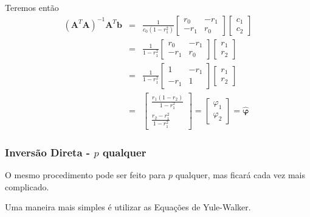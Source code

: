 \begin{frame}[allowframebreaks]
  Teremos então
  \begin{eqnarray}
  (\mathbf{A}^T \mathbf{A})^{-1} \mathbf{A}^T\mathbf{b} &=& \frac{1}{c_0 ( 1 - r_1^2)} \begin{bmatrix} r_0 & -r_1 \\ -r_1 & r_0 \end{bmatrix} \begin{bmatrix} c_1 \\ c_2 \end{bmatrix} \nonumber \\
  &=& \frac{1}{ 1 - r_1^2 } \begin{bmatrix} r_0 & -r_1 \\ -r_1 & r_0 \end{bmatrix} \begin{bmatrix} r_1 \\ r_2 \end{bmatrix} \nonumber \\
  &=& \frac{1}{ 1 - r_1^2 } \begin{bmatrix} 1 & -r_1 \\ -r_1 & 1 \end{bmatrix} \begin{bmatrix} r_1 \\ r_2 \end{bmatrix} \nonumber \\
  &=& \begin{bmatrix} \frac{r_1(1-r_2)}{1-r_1^2} \\ \frac{r_2 - r_1^2}{1 - r_1^2} \end{bmatrix} = \begin{bmatrix} \varphi_1 \\ \varphi_2 \end{bmatrix} = \hat{\mathbf{\varphi}}
  \end{eqnarray}
\end{frame}



\begin{frame}
  \frametitle{Inversão Direta - $p$ qualquer}
  O mesmo procedimento pode ser feito para $p$ qualquer, 
  mas ficará cada vez mais complicado.
  
  \vspace{1cm}
  Uma maneira mais simples é utilizar as Equações de Yule-Walker.
\end{frame}
  
